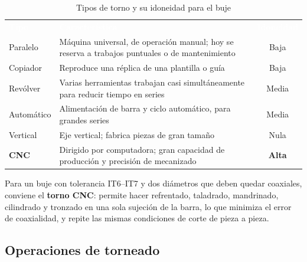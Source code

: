 \documentclass[12pt,a4paper]{article}
\newcommand{\encab}[1]{\textcolor{white}{\sffamily\bfseries #1}}
\begin{document}
\begin{table}[!htb]
	\centering
	\caption{Tipos de torno y su idoneidad para el buje}\label{tab:tornos}
	\small
	\begin{tabularx}{\linewidth}{l X c}
		\rowcolor{darkblue}
		\encab{Tipo}                                    & \encab{Característica}
		                                                & \encab{Idoneidad}
		\\
		Paralelo                                        & Máquina universal, de operación manual; hoy se
		reserva a trabajos puntuales o de mantenimiento & Baja                                                                                             \\
		Copiador                                        & Reproduce una réplica de una plantilla o guía
		                                                & Baja                                                                                             \\
		Revólver                                        & Varias herramientas trabajan casi simultáneamente para
		reducir tiempo en series                        & Media                                                                                            \\
		Automático                                      & Alimentación de barra y ciclo automático, para grandes
		series                                          & Media
		\\
		Vertical                                        & Eje vertical; fabrica piezas de gran tamaño
		                                                & Nula                                                                                             \\
		\textbf{CNC}                                    & Dirigido por computadora; gran capacidad de producción y precisión de mecanizado & \textbf{Alta} \\
	\end{tabularx}
\end{table}

Para un buje con tolerancia IT6--IT7 y dos diámetros que deben quedar coaxiales,
conviene el \textbf{torno CNC}: permite hacer refrentado, taladrado, mandrinado,
cilindrado y tronzado en una sola sujeción de la barra, lo que minimiza el error
de coaxialidad, y repite las mismas condiciones de corte de pieza a pieza.

\subsection{Operaciones de torneado}
\end{document}
